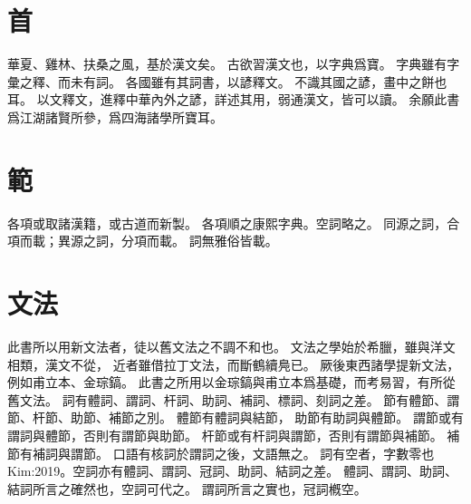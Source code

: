 \chapter{首}
華夏、雞林、扶桑之風，基於漢文矣。
古欲習漢文也，以字典爲寶。
字典雖有字彙之釋、而未有詞。
各國雖有其詞書，以諺釋文。
不識其國之諺，畫中之餅也耳。
以文釋文，進釋中華內外之諺，詳述其用，弱通漢文，皆可以讀。
余願此書爲江湖諸賢所參，爲四海諸學所寶耳。
\chapter{範}
各項或取諸漢籍，或古道而新製。
各項順之康熙字典。空詞略之。
同源之詞，合項而載；異源之詞，分項而載。
詞無雅俗皆載。
\chapter{文法}
此書所以用新文法者，徒以舊文法之不調不和也。
文法之學始於希臘，雖與洋文相類，漢文不從，
近者雖借拉丁文法，而斷鶴續鳧已\parencite{Ahn:2012}。
厥後東西諸學提新文法，例如甫立本、金琮鎬\cite{PulleyblankYang:2005}\cite{Kim:2019}。
此書之所用以金琮鎬與甫立本爲基礎，而考易習，有所從舊文法。
詞有體詞、謂詞、杆詞、助詞、補詞、標詞、刻詞之差\parencite[2-35]{Kim:2019}。
節有體節、謂節、杆節、助節、補節之別\parencite[15]{Kim:2019}。
體節有體詞與結節，
助節有助詞與體節。
謂節或有謂詞與體節，否則有謂節與助節。
杆節或有杆詞與謂節，否則有謂節與補節。
補節有補詞與謂節。
口語有核詞於謂詞之後，文語無之。
詞有空者，字數零也{Kim:2019}。空詞亦有體詞、謂詞、冠詞、助詞、結詞之差。
體詞、謂詞、助詞、結詞所言之確然也，空詞可代之。
謂詞所言之實也，冠詞槪空。
